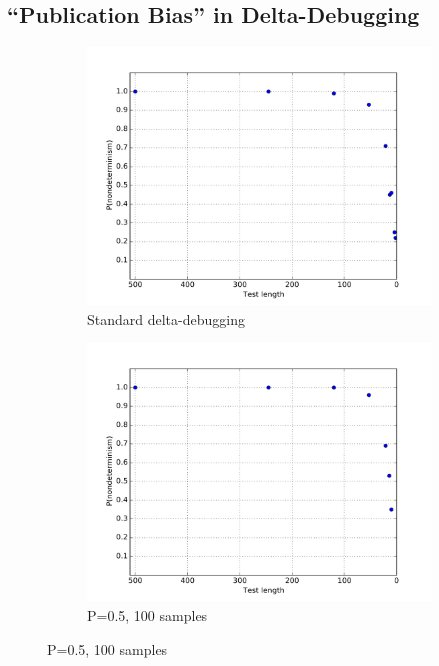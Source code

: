 \subsection{``Publication Bias'' in Delta-Debugging}
\label{sec:pubbias}

\begin{figure}
\centering 
\begin{subfigure}{0.30\columnwidth}
\centering
\includegraphics[width=\columnwidth]{lengthddmin}
\caption{Standard delta-debugging}
\label{fig:p1}
\end{subfigure}
\begin{subfigure}{0.30\columnwidth}
\centering
\includegraphics[width=\columnwidth]{lengthddminforcep}
\caption{P=0.5, 100 samples}

\end{subfigure}
\end{figure}
